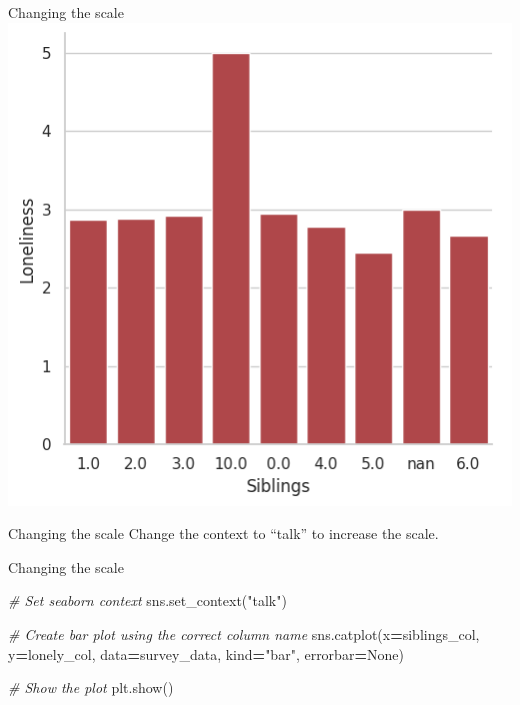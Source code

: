 \documentclass[
  ignorenonframetext,
]{beamer}
\newenvironment{Shaded}{\begin{snugshade}}{\end{snugshade}}
\newcommand{\CommentTok}[1]{\textcolor[rgb]{0.56,0.35,0.01}{\textit{#1}}}
\newcommand{\NormalTok}[1]{#1}
\newcommand{\OperatorTok}[1]{\textcolor[rgb]{0.81,0.36,0.00}{\textbf{#1}}}
\newcommand{\StringTok}[1]{\textcolor[rgb]{0.31,0.60,0.02}{#1}}
\newcommand{\VariableTok}[1]{\textcolor[rgb]{0.00,0.00,0.00}{#1}}
\begin{document}
\begin{frame}{Changing the scale}
\label{changing-the-scale-10}
\includegraphics{../images/im300.png}
\end{frame}

\begin{frame}{Changing the scale}
\label{changing-the-scale-11}
Change the context to ``talk'' to increase the scale.
\end{frame}

\begin{frame}[fragile]{Changing the scale}
\label{changing-the-scale-12}

\begin{Shaded}
\begin{Highlighting}[]
\CommentTok{\# Set seaborn context}
\NormalTok{sns.set\_context(}\StringTok{"talk"}\NormalTok{)}

\CommentTok{\# Create bar plot using the correct column name}
\NormalTok{sns.catplot(x}\OperatorTok{=}\NormalTok{siblings\_col, y}\OperatorTok{=}\NormalTok{lonely\_col, }
\NormalTok{            data}\OperatorTok{=}\NormalTok{survey\_data, kind}\OperatorTok{=}\StringTok{"bar"}\NormalTok{, errorbar}\OperatorTok{=}\VariableTok{None}\NormalTok{)}

\CommentTok{\# Show the plot}
\NormalTok{plt.show()}
\end{Highlighting}
\end{Shaded}
\end{frame}
\end{document}

